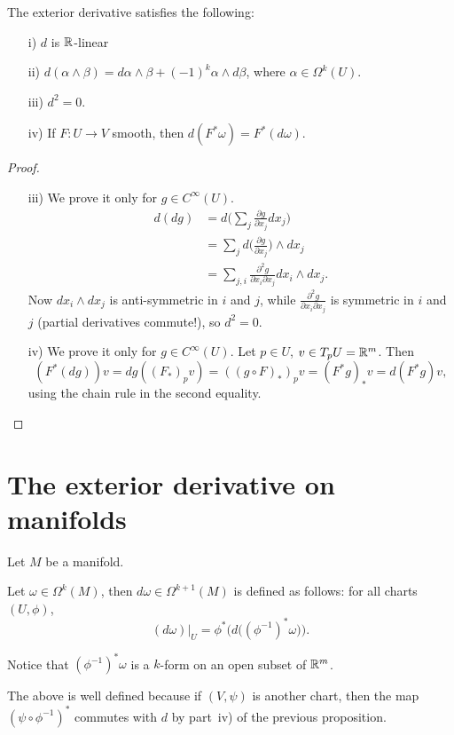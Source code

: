 \begin{prop}
    The exterior derivative satisfies the following:
    \begin{itemize}
        \item[i)] $d$ is $\mathbb{R}$-linear
        \item[ii)] $d(\alpha \wedge \beta) = d \alpha \wedge \beta + (-1)^{k} \alpha \wedge d \beta$, where $\alpha \in  \Omega^{k}(U)$.
        \item[iii)] $d^2 = 0$.
        \item[iv)] If $F: U \to  V$ smooth, then 
            $d(F^* \omega) = F^*(d \omega)$.
    \end{itemize}
\end{prop}
\begin{proof}
    \begin{itemize}
        \item[iii)] We prove it only for $g \in C^{\infty}(U)$.
            \begin{align*}
                d(dg) &= d\Big(\sum_j \frac{\partial g}{\partial x_{j}} dx_{j}\Big)\\
                      &= \sum_j d\Big(\frac{\partial g}{\partial x_{j}}\Big) \wedge dx_{j}\\
                      &= \sum_{j,i}  \frac{\partial^2 g}{\partial x_{i}\partial x_{j}}  dx_{i} \wedge dx_{j}.
           \end{align*}
 Now $dx_{i}\wedge dx_{j}$ is anti-symmetric in $i$ and $j$, while $\frac{\partial^2 g}{\partial x_{i}\partial x_{j}}$ is symmetric in $i$ and $j$ (partial derivatives commute!), so $d^2 = 0$.
       \item[iv)]  We prove it only for $g \in C^{\infty}(U)$.           Let $p \in U$, $v \in  T_p U = \mathbb{R}^{m}$. Then
           \[
               (F^*(dg))v = dg((F_*)_p v) = ((g  \circ  F)_*)_p v = 
               (F^* g)_* v = d (F^* g) v
           ,\] 
  using the chain rule in the second equality.         
    \end{itemize}
\end{proof}

\section{The exterior derivative on manifolds}
Let $M$ be a manifold.
\begin{definition}
    Let $\omega \in \Omega^{k}(M)$, then $d\omega \in \Omega^{k+1}(M)$ is defined as follows: for all charts $(U, \phi)$,
     \[
         (d\omega)|_U =  \phi^*\Big(d\Big((\phi ^{-1})^*\omega\Big)\Big)
    .\]
\end{definition}
Notice that $(\phi ^{-1})^*\omega$ is a $k$-form on an open subset of $\mathbb{R}^m$.
\begin{remark}
    The above is well defined because if $(V, \psi)$ is another chart, then the map 
$(\psi  \circ  \phi^{-1})^*$
    commutes with $d$ by part~iv) of the previous proposition.
\end{remark}

